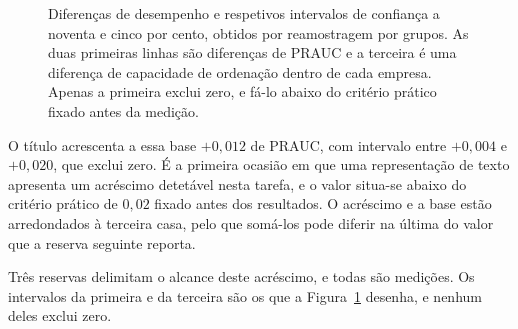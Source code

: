 \begin{figure}[htbp]
\centering
{}
\caption[Os três acréscimos, com intervalo de confiança]{Diferenças de desempenho e respetivos
intervalos de confiança a noventa e cinco por cento, obtidos por reamostragem por grupos. As duas
primeiras linhas são diferenças de \gls{PRAUC} e a terceira é uma diferença de capacidade de
ordenação dentro de cada empresa. Apenas a primeira exclui zero, e fá-lo abaixo do critério prático
fixado antes da medição.}
\label{fig:av_acrescimo}
\end{figure}

O título acrescenta a essa base $+0{,}012$ de \gls{PRAUC}, com intervalo entre $+0{,}004$ e
$+0{,}020$, que exclui zero. É a primeira ocasião em que uma representação de texto apresenta um
acréscimo detetável nesta tarefa, e o valor situa-se abaixo do critério prático de $0{,}02$ fixado
antes dos resultados. O acréscimo e a base estão arredondados à terceira casa, pelo que somá-los
pode diferir na última do valor que a reserva seguinte reporta.

Três reservas delimitam o alcance deste acréscimo, e todas são medições. Os intervalos da primeira
e da terceira são os que a Figura~\ref{fig:av_acrescimo} desenha, e nenhum deles exclui zero.

